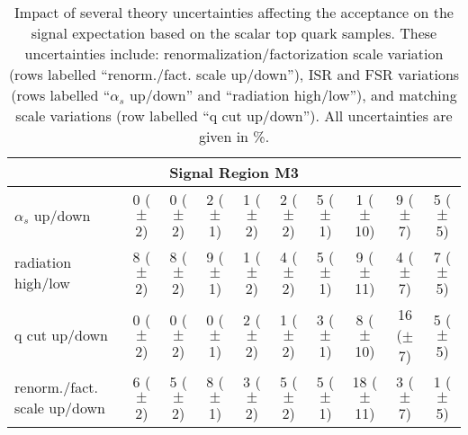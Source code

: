 \begin{sidewaystable}[h!]
\begin{center}
\begin{small}
\begin{tabular}{lccccccccc}
                \hline
                \multicolumn{10}{c}{Signal Region M3}\\
                  \hline
                  $\alpha_s$ up/down   &  0   ($\pm$ 2)  &  0  ($\pm$ 2)  &  2   ($\pm$ 1)  &  1   ($\pm$ 2)  &  2   ($\pm$ 2)  &  5   ($\pm$ 1) &  1   ($\pm$ 10)  &  9   ($\pm$ 7)  &  5  ($\pm$ 5)\\
                    radiation high/low  &  8   ($\pm$ 2)  &  8   ($\pm$ 2)  &  9   ($\pm$ 1)  &  1   ($\pm$ 2)  & 4   ($\pm$ 2)  &  5   ($\pm$ 1)  &  9   ($\pm$ 11)  &  4   ($\pm$ 7)  &  7   ($\pm$ 5)\\
                    q cut up/down       &  0   ($\pm$ 2)  &  0   ($\pm$ 2)  &  0   ($\pm$ 1)  &  2   ($\pm$ 2)  & 1   ($\pm$ 2)  &  3   ($\pm$ 1)  &  8   ($\pm$ 10)  &  16  ($\pm$ 7)  &  5   ($\pm$ 5)\\
                    renorm./fact. scale up/down & 6   ($\pm$ 2)  &  5   ($\pm$ 2)  &  8   ($\pm$ 1)  &  3   ($\pm$ 2)  & 5   ($\pm$ 2)  &  5   ($\pm$ 1)  &  18  ($\pm$ 11)  &  3   ($\pm$ 7)  &  1   ($\pm$ 5)\\
                    \hline\hline
                    \end{tabular}
                    \end{small}
                    \end{center}
                    \caption[Impact of several theory uncertainties affecting the acceptance on the signal expectation based on the scalar top quark samples.]
{Impact of several theory uncertainties affecting the acceptance on the signal expectation based on the scalar top quark samples.
                      These uncertainties include: renormalization/factorization scale variation (rows labelled ``renorm./fact. scale up/down''), ISR and FSR variations (rows labelled ``$\alpha_s$ up/down'' and ``radiation high/low''), and matching scale variations (row labelled ``q cut up/down'').
                        All uncertainties are given in \%.}
                      \label{tab:signalsyst_mono}
                      \end{sidewaystable}

